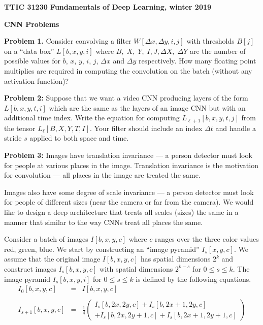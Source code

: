 \documentclass{article}
\newcommand{\solution}[1]{\bigskip {\color{red} {\bf Solution}: #1}}
\begin{document}
\centerline{\bf TTIC 31230 Fundamentals of Deep Learning, winter 2019}

\medskip
\centerline{\bf CNN Problems}

\bigskip
{\bf Problem 1.}  Consider convolving a filter $W[\Delta x, \Delta y, i,j]$  with thresholds $B[j]$ on a ``data box'' $L[b,x,y,i]$ where $B,\;X,\;Y,\;I, J,\Delta X,\;\Delta Y$
are the number of possible values for $b$, $x$, $y$, $i$, $j$, $\Delta x$ and $\Delta y$ respectively.
How many floating point multiplies are required
in computing the convolution on the batch (without any activation function)?

\solution{$$BXY\;\Delta X\;\Delta Y \;IJ$$}

\bigskip
{\bf Problem 2:} Suppose that we want a video CNN producing layers of the form $L[b,x,y,t,i]$ which are the same as the layers of an image CNN but with an additional time index.
Write the equation for computing $L_{\ell+1}[b,x,y,t,j]$ from the tensor $L_\ell[B,X,Y,T,I]$.  Your filter should include an index $\Delta t$ and handle a stride $s$ applied
to both space and time.

\solution{
  $$L_{\ell + 1}[b,x,y,t,j] = \sum_{\Delta x, \Delta y, \Delta t, i} W[\Delta x, \Delta y, \Delta t, i, j] L_\ell[b, sx+ \Delta x, sy + \Delta y, st + \Delta t, i]$$
  }

\bigskip
{\bf Problem 3:} Images have translation invariance --- a person detector must look for people at various places in the image.  Translation invariance is the motivation for
convolution --- all places in the image are treated the same.

\medskip
Images also have some degree of scale invariance --- a person detector must look for people of different sizes
(near the camera or far from the camera).  We would like to design a deep architecture that treats all scales (sizes) the same in a manner that similar to the way CNNs
treat all places the same.

\medskip
Consider a batch of images
$I[b,x,y,c]$ where $c$ ranges over the three color values red, green, blue. We start by constructing an ``image pyramid'' $I_s[x,y,c]$.
We assume that the original image $I[b,x,y,c]$ has spatial dimensions $2^k$ and construct images $I_s[b,x,y,c]$ with spatial dimensions $2^{k-s}$
for $0 \leq s \leq k$.  The image pyramid $I_s[b,x,y,i]$ for $0 \leq s \leq k$ is defined by the following equations.
\begin{eqnarray*}
  I_0[b,x,y,c] & = & I[b,x,y,c] \\
  \\
  I_{s+1}[b,x,y,c] & = & \frac{1}{4}\left(\begin{array}{l} I_s[b,2x,2y,c] + I_s[b,2x+1,2y,c] \\ + I_s[b,2x,2y+1,c] + I_s[b,2x+1,2y+1,c]\end{array}\right)
\end{eqnarray*}
\end{document}
